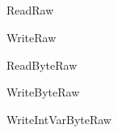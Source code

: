 \subsection{}

\begin{procdesc}{ReadRaw}{}
\end{procdesc}

\begin{procdesc}{WriteRaw}{}
\end{procdesc}

\begin{procdesc}{ReadByteRaw}{}
\end{procdesc}

\begin{procdesc}{WriteByteRaw}{}
\end{procdesc}

\begin{procdesc}{WriteIntVarByteRaw}{}
\end{procdesc}
